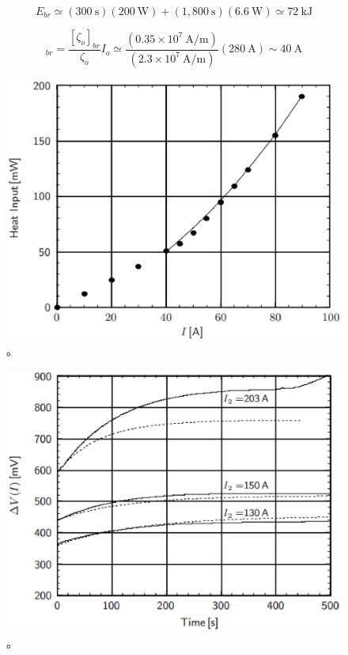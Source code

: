 \begin{equation}
E_{br}\simeq(300\ \mathrm{s})(200\ \mathrm{W})+(1,800\ \mathrm{s})(6.6\ \mathrm{W}) 
\simeq 72\ \mathrm{kJ}
\end{equation}

\begin{equation}
[I_o]_{br}=\frac{[\zeta_o]_{br}}{\zeta_o}I_o 
\simeq\frac{(0.35\times 10^7\ \mathrm{A/m})}{(2.3\times 10^7\ \mathrm{A/m})}(280\ \mathrm{A})\sim 40\ \mathrm{A}
\end{equation}


\begin{figure}[htbp]
	\centering
	\includegraphics[scale=0.7]{chpt4/figs/fig4.25.eps}
	\caption{。}
\end{figure}

\begin{figure}[htbp]
	\centering
	\includegraphics[scale=0.7]{chpt4/figs/fig4.26.eps}
	\caption{。}
\end{figure}


